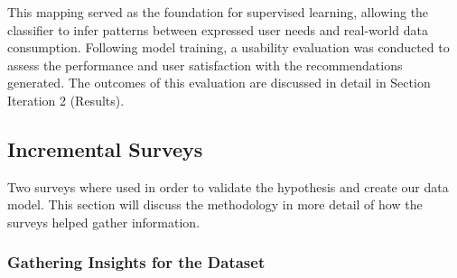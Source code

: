 \documentclass[conference]{IEEEtran}
\begin{document}
This mapping served as the foundation for supervised learning, allowing the classifier to infer patterns between expressed user needs and real-world data consumption. Following model training, a usability evaluation was conducted to assess the performance and user satisfaction with the recommendations generated. The outcomes of this evaluation are discussed in detail in Section Iteration 2 (Results).

\subsection{Incremental Surveys}
Two surveys where used in order to validate the hypothesis and create our data model. This section will discuss the methodology in more detail of how the surveys helped gather information.
\subsubsection{Gathering Insights for the Dataset}
\end{document}
